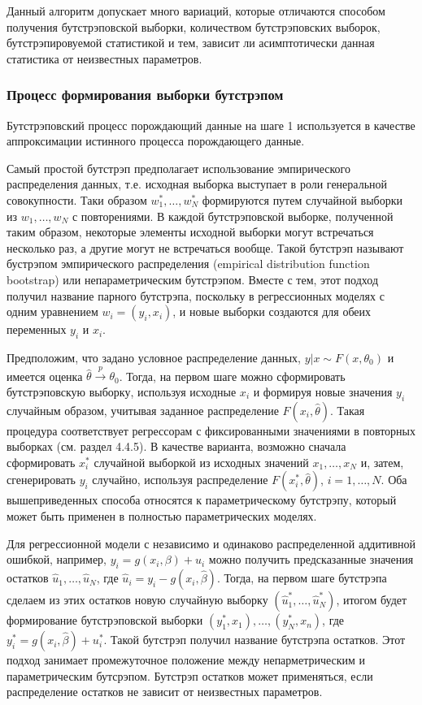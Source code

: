 Данный алгоритм допускает много вариаций, которые отличаются способом получения бутстрэповской выборки, количеством бутстрэповских выборок, бутстрэпировуемой статистикой и тем, зависит ли асимптотически данная статистика  от неизвестных параметров.


\subsubsection*{Процесс формирования выборки бутстрэпом}


Бутстрэповский процесс порождающий данные на шаге 1 используется в качестве аппроксимации истинного процесса порождающего данные.

Самый простой бутстрэп предполагает использование эмпирического распределения данных, т.е. исходная выборка выступает в роли генеральной совокупности. Таки образом $w_1^*,\ldots ,w_N^*$ формируются путем случайной выборки из  $w_1,\ldots ,w_N$ с повторениями. В каждой бутстрэповской выборке, полученной таким образом, некоторые элементы исходной выборки могут встречаться несколько раз, а другие могут не встречаться вообще. Такой бутстрэп называют бустрэпом эмпирического распределения (empirical distribution function bootstrap) или непараметрическим бутстрэпом. Вместе с тем, этот подход получил название парного бутстрэпа, поскольку в регрессионных моделях с одним уравнением $w_i=(y_i,x_i)$, и новые выборки создаются для обеих переменных $y_i$ и $x_i$. 

Предположим, что задано условное распределение данных, $y|x\sim F(x,\theta_0)$ и имеется оценка $\hat{\theta} \stackrel{p}{\rightarrow} \theta_0$. Тогда, на первом шаге можно сформировать бутстрэповскую выборку, используя исходные $x_i$ и формируя новые значения $y_i$ случайным образом, учитывая заданное распределение $F(x_i,\hat{\theta})$. Такая процедура соответствует регрессорам с фиксированными значениями в повторных выборках (см. раздел 4.4.5). В качестве варианта, возможно сначала сформировать $x_i^*$ случайной выборкой из исходных значений $x_1,\ldots, x_N$ и, затем, сгенерировать $y_i$ случайно, используя распределение $F(x_i^*,\hat{\theta})$, $i=1,\ldots, N$. Оба вышеприведенных способа относятся к параметрическому бутстрэпу, который может быть применен в полностью  параметрических моделях.


Для регрессионной модели с независимо и одинаково распределенной аддитивной ошибкой, например, $y_i=g(x_i,\beta)+u_i$ можно получить предсказанные значения остатков $\hat{u}_1,\ldots ,\hat{u}_N$, где $\hat{u}_i=y_i-g(x_i,\hat{\beta})$. Тогда, на первом шаге бутстрэпа сделаем из этих остатков новую случайную выборку $(\hat{u}_1^*,\ldots ,\hat{u}_N^*)$, итогом будет формирование бутстрэповской выборки $(y_1^*,x_1),\ldots,(y_N^*,x_n)$, где $y_i^*=g(x_i,\hat{\beta})+u_i^*$. Такой бутстрэп получил название бутстрэпа остатков. Этот подход занимает промежуточное положение между непарметрическим и параметрическим бутсрэпом. Бутстрэп остатков может применяться, если распределение остатков не зависит от неизвестных параметров.

